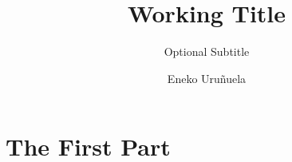 \documentclass[colophon, english, screen]{phduio}
\author{Eneko Uruñuela}
\title{Working Title}
\subtitle{Optional Subtitle}
\affiliation
{
    Optional Second Affiliation
    \and
    Optional Further Specification
}
\begin{document}
    \frontmatter        %

    \uiotitle

    
    
    

    \cleartorecto
    \tableofcontents    %
    \cleartorecto
    \listoffigures      %
    \cleartorecto
    \listoftables       %

    \mainmatter         %

    

    \part{The First Part}

    
    
    

    \appendix           %
    \appendixpage       %

    
    

    \backmatter         %

    \printbibliography
\end{document}
